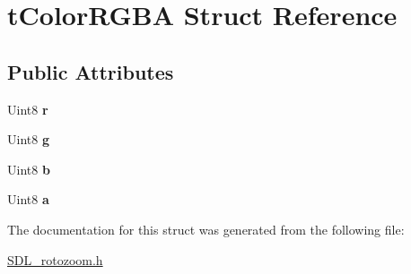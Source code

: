 \hypertarget{structtColorRGBA}{}\section{t\+Color\+R\+G\+BA Struct Reference}
\label{structtColorRGBA}
\subsection*{Public Attributes}
\begin{DoxyCompactItemize}
\item 
Uint8 {\bfseries r}\hypertarget{structtColorRGBA_a96efe754f0357efcfb2fa56447dfb76e}{}\label{structtColorRGBA_a96efe754f0357efcfb2fa56447dfb76e}

\item 
Uint8 {\bfseries g}\hypertarget{structtColorRGBA_a22f3efdc47c67f2672be345f7c7e8cb1}{}\label{structtColorRGBA_a22f3efdc47c67f2672be345f7c7e8cb1}

\item 
Uint8 {\bfseries b}\hypertarget{structtColorRGBA_ab6aa469c65af3c3bc56dd3657698c3b3}{}\label{structtColorRGBA_ab6aa469c65af3c3bc56dd3657698c3b3}

\item 
Uint8 {\bfseries a}\hypertarget{structtColorRGBA_a3177aa7ac55c6bdfa6288c6bc5e99628}{}\label{structtColorRGBA_a3177aa7ac55c6bdfa6288c6bc5e99628}

\end{DoxyCompactItemize}


The documentation for this struct was generated from the following file\+:\begin{DoxyCompactItemize}
\item 
\hyperlink{SDL__rotozoom_8h}{S\+D\+L\+\_\+rotozoom.\+h}\end{DoxyCompactItemize}
